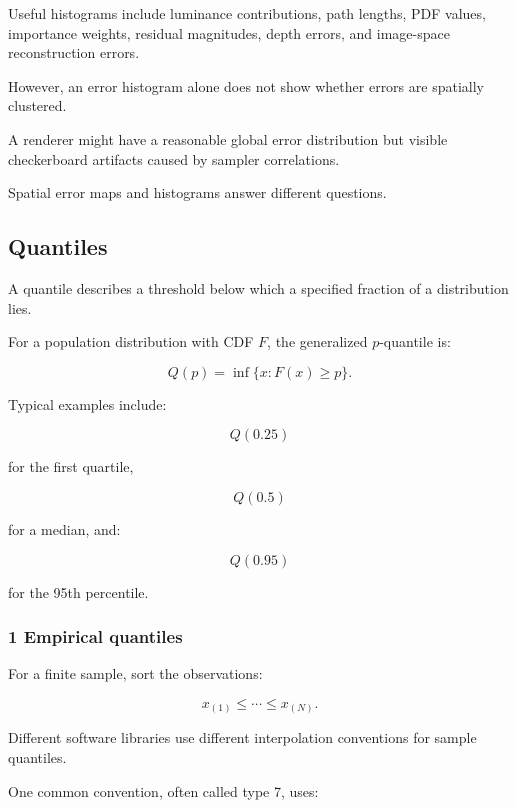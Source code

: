 \hypertarget{02-foundations-ii-ch030-histograms-in-renderer-debugging}{}

Useful histograms include luminance contributions, path lengths, PDF values, importance weights, residual magnitudes, depth errors, and image-space reconstruction errors.

However, an error histogram alone does not show whether errors are spatially clustered.

A renderer might have a reasonable global error distribution but visible checkerboard artifacts caused by sampler correlations.

Spatial error maps and histograms answer different questions.

\subsection{Quantiles}\label{02-foundations-ii-ch030-quantiles}

\hypertarget{02-foundations-ii-ch030-quantiles}{}

A quantile describes a threshold below which a specified fraction of a distribution lies.

For a population distribution with CDF \(F\), the generalized \(p\)-quantile is:

\[
 \boxed{ Q(p)=\inf\{x:F(x)\ge p\} }.
\]

Typical examples include:

\[
 Q(0.25)
\]

for the first quartile,

\[
 Q(0.5)
\]

for a median, and:

\[
 Q(0.95)
\]

for the 95th percentile.

\subsubsection{1 Empirical quantiles}\label{02-foundations-ii-ch030-empirical-quantiles}

\hypertarget{02-foundations-ii-ch030-empirical-quantiles}{}

For a finite sample, sort the observations:

\[
 x_{(1)}\le\cdots\le x_{(N)}.
\]

Different software libraries use different interpolation conventions for sample quantiles.

One common convention, often called type 7, uses:

